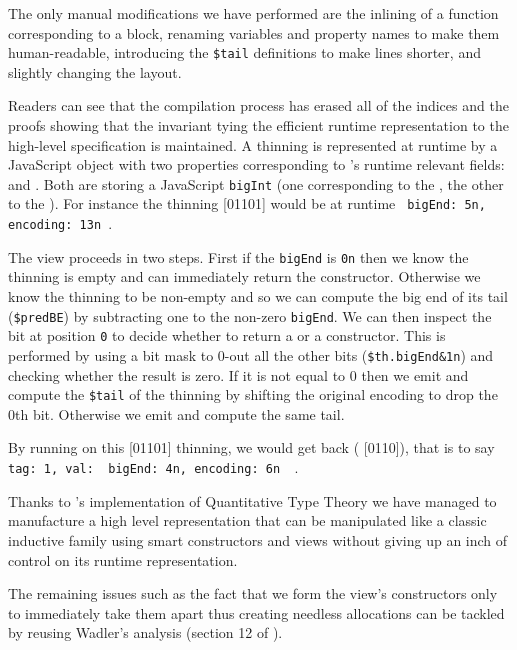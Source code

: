 The only manual modifications we have performed are the inlining of a function
corresponding to a  block, renaming variables and property names
to make them human-readable, introducing the \texttt{\$tail} definitions to make
lines shorter, and slightly changing the layout.



Readers can see that the compilation process has erased all of the indices
and the proofs
showing that the invariant tying the efficient runtime representation to the
high-level specification is maintained.
%
A thinning is represented at runtime by a JavaScript object with two properties
corresponding to 's runtime relevant fields: 
and .
%
Both are storing a JavaScript \texttt{bigInt} (one corresponding to the
, the other to the ).
%
For instance the thinning [01101] would be at runtime
\texttt{{ bigEnd: 5n, encoding: 13n }}.
%

The view proceeds in two steps. First if the \texttt{bigEnd} is \texttt{0n}
then we know the thinning is empty and can immediately return the 
constructor.
%
Otherwise we know the thinning to be non-empty and so we can compute the big end
of its tail (\texttt{\$predBE}) by subtracting one to the non-zero \texttt{bigEnd}.
We can then inspect the bit at position \texttt{0} to decide whether to return a
 or a  constructor. This is performed by using a
bit mask to 0-out all the other bits (\texttt{\$th.bigEnd\&1n}) and checking whether
the result is zero.
%
If it is not equal to 0 then we emit  and compute the \texttt{\$tail}
of the thinning by shifting the original encoding to drop the 0th bit. Otherwise we
emit  and compute the same tail.

By running  on this [01101] thinning, we would get
back ( [0110]), that is to say
\texttt{{ tag: 1, val: { bigEnd: 4n, encoding: 6n } }}.

Thanks to \idris{}'s implementation of Quantitative Type Theory we have managed
to manufacture a high level representation that can be manipulated like a classic
inductive family using smart constructors and views without giving up an inch of
control on its runtime representation.

The remaining issues such as the fact that we form the view's constructors only
to immediately take them apart thus creating needless allocations can be tackled
by reusing Wadler's analysis (section 12 of \cite{DBLP:conf/popl/Wadler87}).
